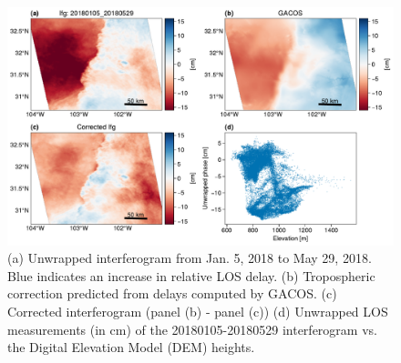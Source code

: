 

%



\begin{figure}
	\centering
	\includegraphics[width=1.0\textwidth]{figures/chapter2-sar/figure_tropo_correct_gacos_wave_ph_vs_el.pdf}
	\caption[West Texas tropospheric correction for interferogram containing weather front]{
		(a) Unwrapped interferogram from Jan. 5, 2018 to May 29, 2018. Blue indicates an increase in relative LOS delay.
		(b) Tropospheric correction predicted from delays computed by GACOS.
		(c) Corrected interferogram (panel (b) - panel (c))
		(d) Unwrapped LOS measurements (in cm) of the 20180105-20180529 interferogram vs. the Digital Elevation Model (DEM) heights.
	}
	\label{fig:ch2-tropo-correct-wave}
\end{figure}



